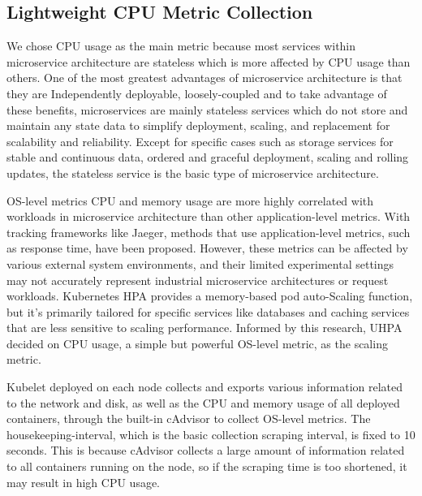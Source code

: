\documentclass[conference]{IEEEtran}
\begin{document}
\subsection{Lightweight CPU Metric Collection}
We chose CPU usage as the main metric because most services within microservice architecture are stateless which is more affected by CPU usage than others. One of the most greatest advantages of microservice architecture is that they are Independently deployable, loosely-coupled\cite{MicroservicesIO} and to take advantage of these benefits, microservices are mainly stateless services which do not store and maintain any state data to simplify deployment, scaling, and replacement for scalability and reliability\cite{AWSStatefulActorServices2023}. Except for specific cases such as storage services for stable and continuous data, ordered and graceful deployment, scaling and rolling updates, the stateless service is the basic type of microservice architecture\cite{KubernetesStatefulSet2023}\cite{gan2019open}.

OS-level metrics CPU and memory usage are more highly correlated with workloads in microservice architecture than other application-level metrics\cite{luo2022power}. With tracking frameworks like Jaeger\cite{JaegerTracing}, methods that use application-level metrics, such as response time, have been proposed\cite{pramesti2022autoscaling}\cite{gan2021sage}. However, these metrics can be affected by various external system environments\cite{luo2022power}, and their limited experimental settings may not accurately represent industrial microservice architectures or request workloads\cite{huye2023lifting}. Kubernetes HPA provides a memory-based pod auto-Scaling function, but it's primarily tailored for specific services like databases and caching services that are less sensitive to scaling performance. Informed by this research, UHPA decided on CPU usage, a simple but powerful OS-level metric, as the scaling metric.

Kubelet deployed on each node collects and exports various information related to the network and disk, as well as the CPU and memory usage of all deployed containers, through the built-in cAdvisor\cite{cAdvisorGithub} to collect OS-level metrics. The housekeeping-interval, which is the basic collection scraping interval, is fixed to 10 seconds. This is because cAdvisor collects a large amount of information related to all containers running on the node, so if the scraping time is too shortened, it may result in high CPU usage\cite{KubecostcAdvisor}.
\end{document}
